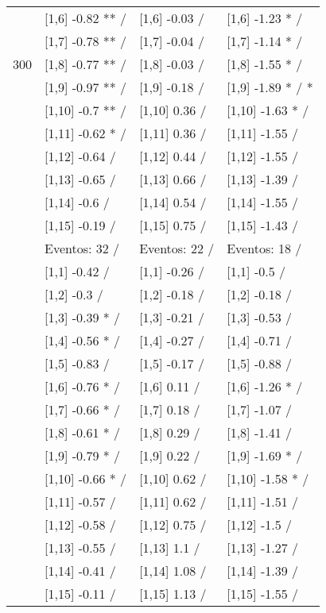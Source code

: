 \begin{table}
\begin{tabular}[t]{llll}
 & {}[1,6] -0.82 ** / & {}[1,6] -0.03  / & {}[1,6] -1.23 * /\\
 & {}[1,7] -0.78 ** / & {}[1,7] -0.04  / & {}[1,7] -1.14 * /\\
300 & {}[1,8] -0.77 ** / & {}[1,8] -0.03  / & {}[1,8] -1.55 * /\\
\addlinespace
 & {}[1,9] -0.97 ** / & {}[1,9] -0.18  / & {}[1,9] -1.89 * / *\\
 & {}[1,10] -0.7 ** / & {}[1,10] 0.36  / & {}[1,10] -1.63 * /\\
 & {}[1,11] -0.62 * / & {}[1,11] 0.36  / & {}[1,11] -1.55  /\\
 & {}[1,12] -0.64  / & {}[1,12] 0.44  / & {}[1,12] -1.55  /\\
 & {}[1,13] -0.65  / & {}[1,13] 0.66  / & {}[1,13] -1.39  /\\
\addlinespace
 & {}[1,14] -0.6  / & {}[1,14] 0.54  / & {}[1,14] -1.55  /\\
 & {}[1,15] -0.19  / & {}[1,15] 0.75  / & {}[1,15] -1.43  /\\
 & Eventos:  32 / & Eventos:  22 / & Eventos:  18 /\\
 & {}[1,1] -0.42  / & {}[1,1] -0.26  / & {}[1,1] -0.5  /\\
 & {}[1,2] -0.3  / & {}[1,2] -0.18  / & {}[1,2] -0.18  /\\
\addlinespace
 & {}[1,3] -0.39 * / & {}[1,3] -0.21  / & {}[1,3] -0.53  /\\
 & {}[1,4] -0.56 * / & {}[1,4] -0.27  / & {}[1,4] -0.71  /\\
 & {}[1,5] -0.83  / & {}[1,5] -0.17  / & {}[1,5] -0.88  /\\
 & {}[1,6] -0.76 * / & {}[1,6] 0.11  / & {}[1,6] -1.26 * /\\
 & {}[1,7] -0.66 * / & {}[1,7] 0.18  / & {}[1,7] -1.07  /\\
\addlinespace
500 & {}[1,8] -0.61 * / & {}[1,8] 0.29  / & {}[1,8] -1.41  /\\
 & {}[1,9] -0.79 * / & {}[1,9] 0.22  / & {}[1,9] -1.69 * /\\
 & {}[1,10] -0.66 * / & {}[1,10] 0.62  / & {}[1,10] -1.58 * /\\
 & {}[1,11] -0.57  / & {}[1,11] 0.62  / & {}[1,11] -1.51  /\\
 & {}[1,12] -0.58  / & {}[1,12] 0.75  / & {}[1,12] -1.5  /\\
\addlinespace
 & {}[1,13] -0.55  / & {}[1,13] 1.1  / & {}[1,13] -1.27  /\\
 & {}[1,14] -0.41  / & {}[1,14] 1.08  / & {}[1,14] -1.39  /\\
 & {}[1,15] -0.11  / & {}[1,15] 1.13  / & {}[1,15] -1.55  /\\
\bottomrule
\end{tabular}
\end{table}
